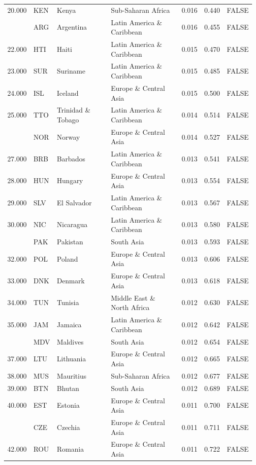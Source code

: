 \begin{table}
\begin{tabular}[t]{lllllll}
20.000 & KEN & Kenya & Sub-Saharan Africa & 0.016 & 0.440 & FALSE\\
\addlinespace
21.000 & ARG & Argentina & Latin America \& Caribbean & 0.016 & 0.455 & FALSE\\
22.000 & HTI & Haiti & Latin America \& Caribbean & 0.015 & 0.470 & FALSE\\
23.000 & SUR & Suriname & Latin America \& Caribbean & 0.015 & 0.485 & FALSE\\
24.000 & ISL & Iceland & Europe \& Central Asia & 0.015 & 0.500 & FALSE\\
25.000 & TTO & Trinidad \& Tobago & Latin America \& Caribbean & 0.014 & 0.514 & FALSE\\
\addlinespace
26.000 & NOR & Norway & Europe \& Central Asia & 0.014 & 0.527 & FALSE\\
27.000 & BRB & Barbados & Latin America \& Caribbean & 0.013 & 0.541 & FALSE\\
28.000 & HUN & Hungary & Europe \& Central Asia & 0.013 & 0.554 & FALSE\\
29.000 & SLV & El Salvador & Latin America \& Caribbean & 0.013 & 0.567 & FALSE\\
30.000 & NIC & Nicaragua & Latin America \& Caribbean & 0.013 & 0.580 & FALSE\\
\addlinespace
31.000 & PAK & Pakistan & South Asia & 0.013 & 0.593 & FALSE\\
32.000 & POL & Poland & Europe \& Central Asia & 0.013 & 0.606 & FALSE\\
33.000 & DNK & Denmark & Europe \& Central Asia & 0.013 & 0.618 & FALSE\\
34.000 & TUN & Tunisia & Middle East \& North Africa & 0.012 & 0.630 & FALSE\\
35.000 & JAM & Jamaica & Latin America \& Caribbean & 0.012 & 0.642 & FALSE\\
\addlinespace
36.000 & MDV & Maldives & South Asia & 0.012 & 0.654 & FALSE\\
37.000 & LTU & Lithuania & Europe \& Central Asia & 0.012 & 0.665 & FALSE\\
38.000 & MUS & Mauritius & Sub-Saharan Africa & 0.012 & 0.677 & FALSE\\
39.000 & BTN & Bhutan & South Asia & 0.012 & 0.689 & FALSE\\
40.000 & EST & Estonia & Europe \& Central Asia & 0.011 & 0.700 & FALSE\\
\addlinespace
41.000 & CZE & Czechia & Europe \& Central Asia & 0.011 & 0.711 & FALSE\\
42.000 & ROU & Romania & Europe \& Central Asia & 0.011 & 0.722 & FALSE\\

\end{tabular}
\end{table}
